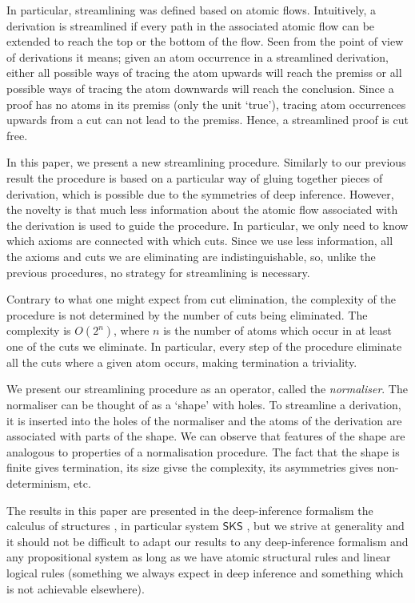 \documentclass[a4paper]{amsart}
\theoremstyle{definition}
\theoremstyle{remark}
\begin{document}
In particular, streamlining was defined based on atomic flows. Intuitively, a derivation is streamlined if every path in the associated atomic flow can be extended to reach the top or the bottom of the flow. Seen from the point of view of derivations it means; given an atom occurrence in a streamlined derivation, either all possible ways of tracing the atom upwards will reach the premiss or all possible ways of tracing the atom downwards will reach the conclusion. Since a proof has no atoms in its premiss (only the unit `true'), tracing atom occurrences upwards from a cut can not lead to the premiss. Hence, a streamlined proof is cut free.

In this paper, we present a new streamlining procedure. Similarly to our previous result the procedure is based on a particular way of gluing together pieces of derivation, which is possible due to the symmetries of deep inference. However, the novelty is that much less information about the atomic flow associated with the derivation is used to guide the procedure. In particular, we only need to know which axioms are connected with which cuts. Since we use less information, all the axioms and cuts we are eliminating are indistinguishable, so, unlike the previous procedures, no strategy for streamlining is necessary.

Contrary to what one might expect from cut elimination, the complexity of the procedure is not determined by the number of cuts being eliminated. The complexity is $O(2^n)$, where $n$ is the number of atoms which occur in at least one of the cuts we eliminate. In particular, every step of the procedure eliminate all the cuts where a given atom occurs, making termination a triviality.

We present our streamlining procedure as an operator, called the \emph{normaliser}. The normaliser can be thought of as a `shape' with holes. To streamline a derivation, it is inserted into the holes of the normaliser and the atoms of the derivation are associated with parts of the shape. We can observe that features of the shape are analogous to properties of a normalisation procedure. The fact that the shape is finite gives termination, its size givse the complexity, its asymmetries gives non-determinism, etc.

\newcommand{\SKS}{\mathsf{SKS}}
The results in this paper are presented in the deep-inference formalism the calculus of structures \cite{Gugl:06:A-System:kl}, in particular system $\SKS$ \cite{BrunTiu:01:A-Local-:mz,Brun:04:Deep-Inf:rq}, but we strive at generality and it should not be difficult to adapt our results to any deep-inference formalism and any propositional system as long as we have atomic structural rules and linear logical rules (something we always expect in deep inference and something which is not achievable elsewhere).
\end{document}
